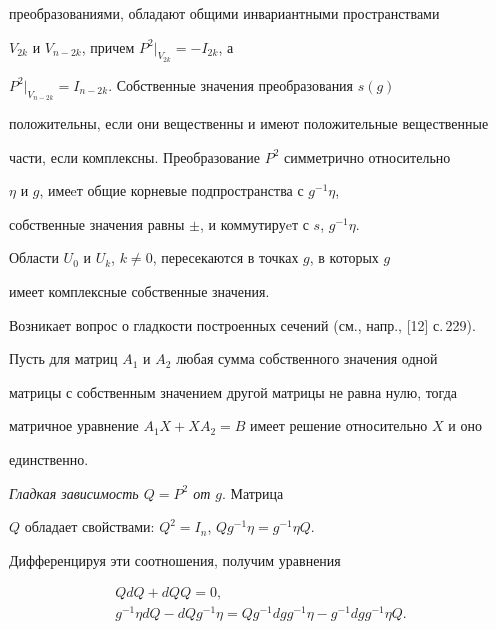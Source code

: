 преобразованиями, обладают общими инвариантными пространствами


$V_{2k}$ и $V_{n-2k}$, причем $P^2\big|_{V_{2k}}=-I_{2k}$, а


$P^2\big|_{V_{n-2k}}=I_{n-2k}$. Собственные значения преобразования $s(g)$ 


положительны, если они вещественны и имеют положительные вещественные 


части, если комплексны. Преобразование $P^2$ симметрично относительно


$\eta$ и $g$, имеeт общие корневые подпространства с $g^{-1}\eta$, 


собственные значения равны $\pm$, и коммутируeт с $s$, $g^{-1}\eta$. 


Области $U_0$ и $U_k$, $k\ne 0$, пересекаются в точках $g$, в которых $g$ 


имеет комплексные собственные значения.





Возникает вопрос о гладкости построенных сечений (см., напр., [12] с.\,229).





\begin{lem}


Пусть для матриц $A_1$ и $A_2$ любая  сумма собственного значения одной 


матрицы с собственным значением другой матрицы не равна нулю, тогда 


матричное уравнение $A_1X+XA_2=B$ имеет решение относительно $X$ и оно 


единственно.


\end{lem}








{\it Гладкая зависимость $Q=P^2 $ от $g$}. Матрица


$Q$ обладает свойствами: $Q^2=I_n$, $Qg^{-1}\eta=g^{-1}\eta Q$.


Дифференцируя эти соотношения, получим уравнения


\begin{gather*}


QdQ+dQQ=0, \\


g^{-1}\eta d Q-dQg^{-1}\eta=Qg^{-1}dgg^{-1}\eta-g^{-1}dgg^{-1}\eta Q.


\end{gather*}


